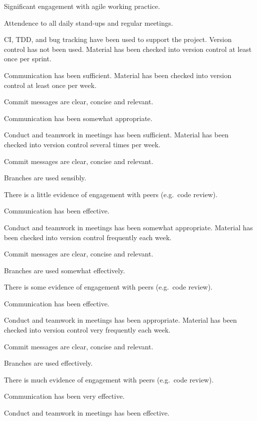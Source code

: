 \documentclass{../../fal_assignment}
\begin{document}
\begin{markingrubric}
        \grade Significant engagement with agile working practice.
            \par Attendence to all daily stand-ups and regular meetings.
            \par CI, TDD, and bug tracking have been used to support the project.
%
        \grade\fail Version control has not been used.
        \grade Material has been checked into version control at least once per sprint.
            \par Communication has been sufficient.
        \grade Material has been checked into version control at least once per week.
            \par Commit messages are clear, concise and relevant.
            \par Communication has been somewhat appropriate.
            \par Conduct and teamwork in meetings has been sufficient.
        \grade Material has been checked into version control several times per week.
            \par Commit messages are clear, concise and relevant.
            \par Branches are used sensibly.
            \par There is a little evidence of engagement with peers (e.g.\ code review).
            \par Communication has been effective.
            \par Conduct and teamwork in meetings has been somewhat appropriate.
        \grade Material has been checked into version control frequently each week.
            \par Commit messages are clear, concise and relevant.
            \par Branches are used somewhat effectively.
            \par There is some evidence of engagement with peers (e.g.\ code review).
            \par Communication has been effective.
            \par Conduct and teamwork in meetings has been appropriate.
        \grade Material has been checked into version control very frequently each week.
            \par Commit messages are clear, concise and relevant.
            \par Branches are used effectively.
            \par There is much evidence of engagement with peers (e.g.\ code review).
            \par Communication has been very effective.
            \par Conduct and teamwork in meetings has been effective.
\end{markingrubric}
\end{document}
